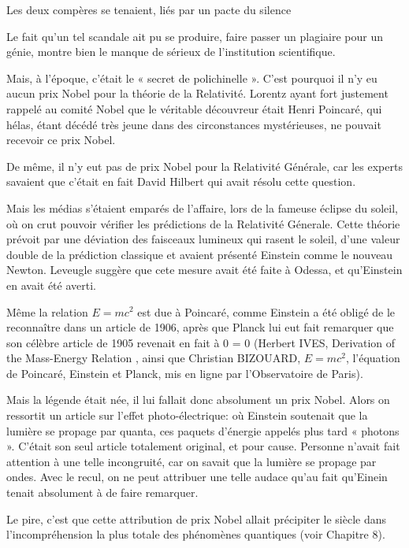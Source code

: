 \documentclass[a4paper,12pt]{article}
\begin{document}
Les deux compères se tenaient, liés par un pacte du silence 

Le fait qu’un tel scandale ait pu se produire, faire passer un plagiaire pour un génie, montre bien le manque de sérieux de l’institution scientifique.

Mais, à l’époque, c’était le « secret de polichinelle ». C’est pourquoi il n’y eu aucun prix Nobel pour la théorie de la Relativité. Lorentz ayant fort justement rappelé au comité Nobel que le véritable découvreur était Henri Poincaré, qui hélas, étant décédé très jeune dans des circonstances mystérieuses, ne pouvait recevoir ce prix Nobel.

De même, il n’y eut pas de prix Nobel pour la Relativité Générale, car les experts savaient que c’était en fait David Hilbert qui avait résolu cette question. 

Mais les médias s’étaient emparés de l’affaire, lors de la fameuse éclipse du soleil, où on crut pouvoir vérifier les prédictions de la Relativité Génerale. Cette théorie prévoit par une déviation des faisceaux lumineux qui rasent le soleil, d’une valeur double de la prédiction classique et avaient présenté Einstein comme le nouveau Newton. Leveugle suggère que cete mesure avait été faite à Odessa, et qu'Einstein en avait été averti.

Même la relation $E = mc^2$ est due à Poincaré, comme Einstein a été obligé de le reconnaître dans un article de 1906, après que Planck lui eut fait remarquer que son célèbre article de 1905 revenait en fait à 0 = 0 (Herbert IVES, Derivation of the Mass-Energy Relation \cite{Ives}, ainsi que Christian BIZOUARD, $E = mc^2$, l'équation de Poincaré, Einstein et Planck, mis en ligne par l’Observatoire de Paris).


Mais la légende était née, il lui fallait donc absolument un prix Nobel. Alors on ressortit un article sur l’effet photo-électrique: où Einstein soutenait que la lumière se propage par quanta, ces paquets d’énergie appelés plus tard « photons ». C’était son seul article totalement original, et pour cause. Personne n’avait fait attention à une telle incongruité, car on savait que la lumière se propage par ondes. Avec le recul, on ne peut attribuer une telle audace qu’au fait qu’Einein tenait absolument à de faire remarquer.

Le pire, c’est que cette attribution de prix Nobel allait précipiter le siècle dans l’incompréhension la plus totale des phénomènes quantiques (voir Chapitre 8).
\end{document}

